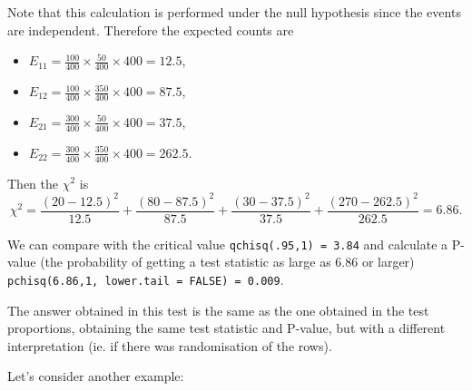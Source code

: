 \documentclass{homework}
\begin{document}
\begin{tcolorbox}[title=Example 1 of Independence Testing]
Note that this calculation is performed under the null hypothesis since the events are independent. Therefore the expected counts are 

\begin{itemize}
    \item $E_{11} = \frac{100}{400}\times\frac{50}{400} \times 400 = 12.5$, 
    \item $E_{12} = \frac{100}{400}\times\frac{350}{400} \times 400 = 87.5$,
    \item $E_{21} = \frac{300}{400}\times\frac{50}{400} \times 400 = 37.5$,
    \item $E_{22} = \frac{300}{400}\times\frac{350}{400} \times 400 = 262.5$. 
\end{itemize}

Then the $\chi^2$ is 
$$
\chi^2 = \frac{(20-12.5)^2}{12.5} + \frac{(80-87.5)^2}{87.5} + \frac{(30-37.5)^2}{37.5} + \frac{(270-262.5)^2}{262.5} =6.86.
$$

We can compare with the critical value \texttt{qchisq(.95,1) = 3.84} and calculate a P-value (the probability of getting a test statistic as large as 6.86 or larger) \texttt{pchisq(6.86,1, lower.tail = FALSE) = 0.009}.

The answer obtained in this test is the same as the one obtained in the test proportions, obtaining the same test statistic and P-value, but with a different interpretation (ie. if there was randomisation of the rows). 

\end{tcolorbox}

\clearpage

Let's consider another example:
\end{document}
